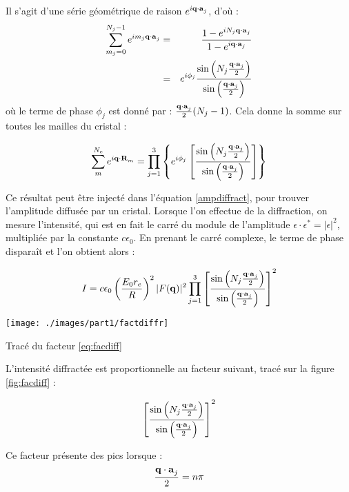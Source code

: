 Il s'agit d'une série géométrique de raison $e^{i \mathbf{q\cdot a}_j}$, d'où :
\begin{eqnarray}
    \sum_{m_j = 0}^{N_j - 1} e^{i m_j \mathbf{q\cdot a}_j} & = &
    \frac{1 - e^{i N_j \mathbf{q\cdot a}_j}}{1 - e^{i \mathbf{q \cdot a}_j}} \\
    & = & e^{i \phi_j} \frac{\sin \left( N_j \frac{\mathbf{q\cdot a}_j}{2} \right) }{\sin \left( \frac{\mathbf{q\cdot a}_j}{2} \right)}
\end{eqnarray}
où le terme de phase $\phi_j$ est donné par : $\frac{\mathbf{q\cdot a}_j}{2} (N_j
-1)$. Cela donne la somme sur toutes les mailles du cristal :

\begin{equation}
    \sum_m^{N_c} e^{i\mathbf{q\cdot R}_m} = \prod_{j=1}^3 \left\{ e^{i\phi_j} \left[ \frac{\sin \left(N_j \frac{\mathbf{q\cdot a}_j}{2}
    \right)}{\sin \left(\frac{\mathbf{q\cdot a}_j}{2} \right)} \right] \right\}
    \label{sommecristal}
\end{equation}

Ce résultat peut être injecté dans l'équation \ref{ampdiffract}, pour trouver
l'amplitude diffusée par un cristal. Lorsque l'on effectue de la diffraction, on
mesure l'intensité, qui est en fait le carré du module de l'amplitude
$\epsilon \cdot \epsilon^* = |\epsilon|^2$, multipliée par la constante
$c\epsilon_0$. En prenant le carré complexe, le terme de phase disparaît et l'on
obtient alors :

\begin{equation}
    I = c\epsilon_0 \left( \frac{E_0 r_e}{R} \right)^2 |F(\mathbf{q})|^2
    \prod_{j=1}^3 \left[ \frac{\sin \left(N_j \frac{\mathbf{q\cdot a}_j}{2} \right)}{\sin \left( \frac{\mathbf{q\cdot a}_j}{2}\right)} \right]^2
\end{equation}

\begin{marginfigure}
    \texttt{[image: ./images/part1/factdiffr]}
    \caption{Tracé du facteur \ref{eq:facdiff}}
    \label{fig:facdiff}
\end{marginfigure}

L'intensité diffractée est proportionnelle au facteur suivant, tracé sur la figure \ref{fig:facdiff} :

\begin{equation}
    \left[ \frac{\sin \left(N_j \frac{\mathbf{q\cdot a}_j}{2} \right)}{\sin \left( \frac{\mathbf{q\cdot a}_j}{2}\right)} \right]^2
    \label{eq:facdiff}
\end{equation}

Ce facteur présente des pics lorsque :
\begin{equation}
    \frac{\mathbf{q \cdot a}_j}{2} = n \pi
\end{equation}

